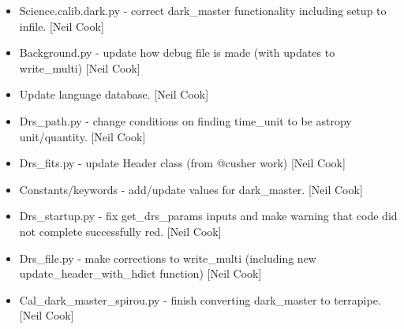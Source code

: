 \documentclass[a4paper,10pt,english]{report}
\begin{document}
\begin{itemize}
\item {} 
Science.calib.dark.py - correct dark\_master functionality including
setup to infile. {[}Neil Cook{]}

\item {} 
Background.py - update how debug file is made (with updates to
write\_multi) {[}Neil Cook{]}

\item {} 
Update language database. {[}Neil Cook{]}

\item {} 
Drs\_path.py - change conditions on finding time\_unit to be astropy
unit/quantity. {[}Neil Cook{]}

\item {} 
Drs\_fits.py - update Header class (from @cusher work) {[}Neil Cook{]}

\item {} 
Constants/keywords - add/update values for dark\_master. {[}Neil Cook{]}

\item {} 
Drs\_startup.py - fix get\_drs\_params inputs and make warning that code
did not complete successfully red. {[}Neil Cook{]}

\item {} 
Drs\_file.py - make corrections to write\_multi (including new
update\_header\_with\_hdict function) {[}Neil Cook{]}

\item {} 
Cal\_dark\_master\_spirou.py - finish converting dark\_master to
terrapipe. {[}Neil Cook{]}

\end{itemize}
\end{document}
